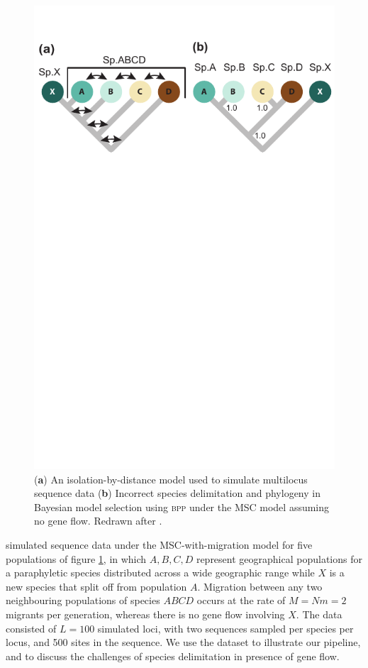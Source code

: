 \documentclass{article1}
\begin{document}
\begin{figure}[t]
   \centering
   \includegraphics[scale=0.7]{figs/fig-ABCDX}
   
   \caption{
   	(\textbf{a}) An isolation-by-distance model used to simulate multilocus
   sequence data 
   (\textbf{b})
   Incorrect species delimitation and phylogeny in Bayesian model selection using
   \textsc{bpp} under the MSC model assuming no gene flow. Redrawn after
   \citet[][fig.~5]{Leache2019}. %
} \label{fig:ABCDX}
\end{figure}


\citet{Leache2019} simulated sequence data under the MSC-with-migration model for five
populations of figure \ref{fig:ABCDX}, in which $A, B, C, D$ represent geographical
populations for a paraphyletic species distributed across a wide geographic range while
$X$ is a new species that split off from population $A$. Migration between any two
neighbouring populations of species $ABCD$ occurs at the rate of $M = Nm = 2$ migrants
per generation, whereas there is no gene flow involving $X$.  The data consisted of
$L=100$ simulated loci, with two sequences sampled per species per locus, and 500 sites
in the sequence.  We use the dataset to illustrate our pipeline, and to discuss the
challenges of species delimitation in presence of gene flow.
\end{document}
